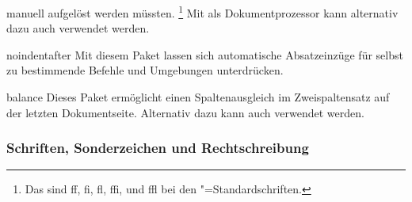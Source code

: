 \begin{packages}
  manuell aufgelöst werden müssten.%
  \footnote{%
    Das sind ff, fi, fl, ffi, und ffl bei den "=Standardschriften.
  }
  Mit  als Dokumentprozessor kann alternativ dazu auch 
   verwendet werden.
\item[noindentafter]
  Mit diesem Paket lassen sich automatische Absatzeinzüge für selbst zu 
  bestimmende Befehle und Umgebungen unterdrücken.
\item[balance]
  Dieses Paket ermöglicht einen Spaltenausgleich im Zweispaltensatz auf der 
  letzten Dokumentseite. Alternativ dazu kann auch  verwendet 
  werden.
\end{packages}

\subsubsection{Schriften, Sonderzeichen und Rechtschreibung}
%
